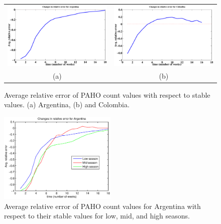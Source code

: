 \begin{figure}[h]
  \centering
   \begin{tabular}{cc}
     \includegraphics[width=.45\columnwidth]{fig/forpaper_AVGrelativeALLs_Argentina.eps} &
     \includegraphics[width=.45\columnwidth]{fig/forpaper_AVGrelativeALLs_Colombia.eps} \\
      (a) & (b) \\ %
  \end{tabular}
  \caption{Average relative error of PAHO count values with respect to stable values.
  (a) Argentina,
  (b) and Colombia.
  \label{fig:relerrors}
  }
\end{figure}

\begin{figure}[h]
  \centering
    \includegraphics[width=0.5\textwidth]{fig/forpaper_seasonalAVGrelativeALLs_Argentina.eps}
  \caption{Average relative error of PAHO count values for Argentina with respect
  to their stable values for low, mid, and high seasons.}
  \label{fig:seasonal_relerrors}
\end{figure}  

